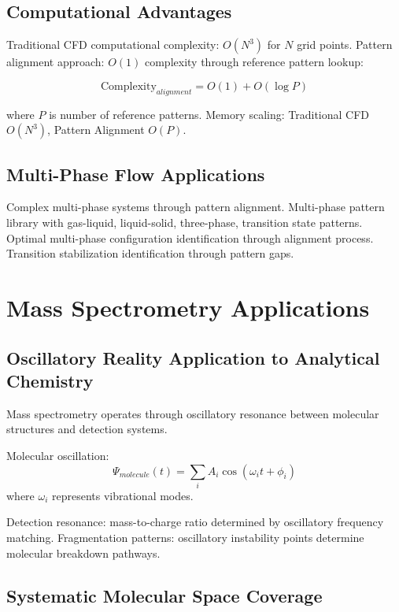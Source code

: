 \documentclass[12pt,a4paper]{article}
\begin{document}
\subsection{Computational Advantages}

Traditional CFD computational complexity: $O(N^3)$ for $N$ grid points. Pattern alignment approach: $O(1)$ complexity through reference pattern lookup:

\begin{equation}
\text{Complexity}_{alignment} = O(1) + O(\log P)
\end{equation}

where $P$ is number of reference patterns. Memory scaling: Traditional CFD $O(N^3)$, Pattern Alignment $O(P)$.

\subsection{Multi-Phase Flow Applications}

Complex multi-phase systems through pattern alignment. Multi-phase pattern library with gas-liquid, liquid-solid, three-phase, transition state patterns. Optimal multi-phase configuration identification through alignment process. Transition stabilization identification through pattern gaps.

\section{Mass Spectrometry Applications}

\subsection{Oscillatory Reality Application to Analytical Chemistry}

Mass spectrometry operates through oscillatory resonance between molecular structures and detection systems.

Molecular oscillation:
\begin{equation}
\Psi_{molecule}(t) = \sum_{i} A_i \cos(\omega_i t + \phi_i)
\end{equation}
where $\omega_i$ represents vibrational modes.

Detection resonance: mass-to-charge ratio determined by oscillatory frequency matching. Fragmentation patterns: oscillatory instability points determine molecular breakdown pathways.

\subsection{Systematic Molecular Space Coverage}
\end{document}
